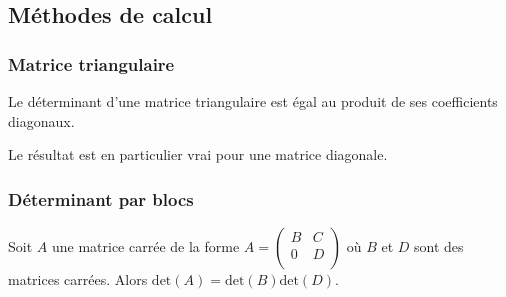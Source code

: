 \documentclass[a4paper,10pt]{report}
\begin{document}
\subsection{Méthodes de calcul}
\subsubsection{Matrice triangulaire}

\begin{prop} Le déterminant d'une matrice triangulaire est égal au produit de ses coefficients diagonaux.
\end{prop}

\begin{rem} Le résultat est en particulier vrai pour une matrice diagonale.
\end{rem}

\subsubsection{Déterminant par blocs}

\begin{prop} Soit $A$ une matrice carrée de la forme $A = \begin{pmatrix}
B & C \\
0 & D \\
\end{pmatrix}$ où $B$ et $D$ sont des matrices carrées. Alors \newline $\textrm{det}(A)= \textrm{det}(B) \textrm{det}(D)$.
\end{prop}
\end{document}
